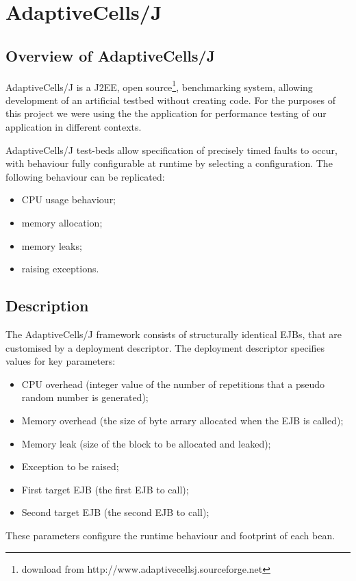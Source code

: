 \chapter{AdaptiveCells/J}

\section*{Overview of AdaptiveCells/J}
AdaptiveCells/J is a J2EE, open source\footnote{download from http://www.adaptivecellsj.sourceforge.net}, benchmarking system, allowing development of an artificial testbed without creating code. For the purposes of this project we were using the the application for performance testing of our application in different contexts.

AdaptiveCells/J test-beds allow specification of precisely timed faults to occur, with behaviour fully configurable at runtime by selecting a configuration. The following behaviour can be replicated:

\begin{itemize}
\item CPU usage behaviour;
\item memory allocation;
\item memory leaks;
\item raising exceptions.
\end{itemize}

\section*{Description}
The AdaptiveCells/J framework consists of structurally identical EJBs, that are customised by a deployment descriptor. The deployment descriptor specifies values for key parameters:
\begin{itemize}
 \item CPU overhead (integer value of the number of repetitions that a pseudo random number is generated);
 \item Memory overhead (the size of byte arrary allocated when the EJB is called);
 \item Memory leak (size of the block to be allocated and leaked);
 \item Exception to be raised;
 \item First target EJB (the first EJB to call);
 \item Second target EJB (the second EJB to call);
\end{itemize}
These parameters configure the runtime behaviour and footprint of each bean. 

